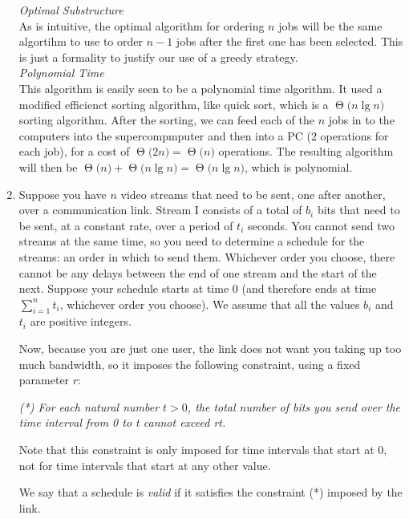 \documentclass[11pts]{article}
\newcommand{\BigTheta}[1]{\ensuremath{\operatorname{\Theta}\bigl(#1\bigr)}}
\begin{document}
\begin{enumerate}
  \textit{Optimal Substructure} \\
  As is intuitive, the optimal algorithm for ordering $n$ jobs will be the
  same algortihm to use to order $n-1$ jobs after the first one has been
  selected. This is just a formality to justify our use of a greedy strategy. \\ 

  \textit{Polynomial Time} \\
  This algorithm is easily seen to be a polynomial time algorithm. It used
  a modified efficienct sorting algorithm, like quick sort,
  which is a \BigTheta{n\lg{n}} sorting algorithm. After the sorting, we
  can feed each of the $n$ jobs in to the computers into the supercompmputer
  and then into a PC (2 operations for each job), for a cost of
  $\BigTheta{2n} = \BigTheta{n}$ operations. The resulting algorithm will
  then be $\BigTheta{n} + \BigTheta{n\lg{n}} = \BigTheta{n\lg{n}}$, which
  is polynomial. \\

\newpage
\item Suppose you have $n$ video streams that need to be sent, one after
another, over a communication link. Stream I consists of a total of $b_i$
bits that need to be sent, at a constant rate, over a period of $t_i$
seconds. You cannot send two streams at the same time, 
so you need to determine a schedule for the streams: an order in which to
send them. Whichever order you choose, there cannot be any delays between the
end of one stream 
and the start of the next. Suppose your schedule starts at time 0
(and therefore ends at time $\sum_{i=1}^{n}t_i$, whichever order you choose).
We assume that all the values $b_i$ and $t_i$ are positive integers.
 
Now, because you are just one user, the link does not want you taking up too 
much bandwidth, so it imposes the following constraint, using a
fixed parameter $r$:

\textit{(*) For each natural number $t > 0$, the total number of bits
you send over the time interval from 0 to t cannot exceed rt.} 

Note that this constraint is only imposed for time intervals that
start at 0, not for time intervals that start at any other value. 

We say that a schedule is \emph{valid} if it satisfies the constraint
(*) imposed by the link.
 

\end{enumerate}
\end{document}

